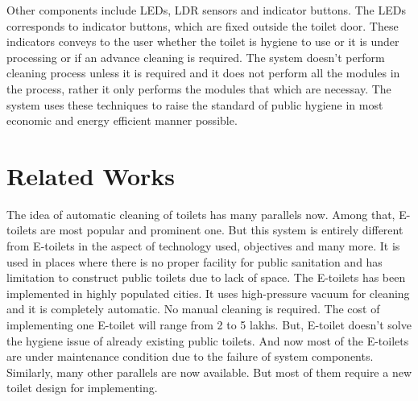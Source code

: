 \documentclass[conference]{IEEEtran}
\begin{document}
Other components include LEDs, LDR sensors and indicator buttons. The LEDs corresponds to indicator buttons, which are fixed outside the toilet door. These indicators conveys to the user whether the toilet is hygiene to use or it is under processing or if an advance cleaning is required. The system doesn't perform cleaning process unless it is required and it does not perform all the modules in the process, rather it only performs the modules that which are necessay. The system uses these techniques to raise the standard of public hygiene in most economic and energy efficient manner possible.

\section{Related Works}
    The idea of automatic cleaning of toilets has many parallels now. Among that, E-toilets are most popular and prominent one. But this system is entirely different from E-toilets in the aspect of technology used, objectives and many more. It is used in places where there is no proper facility for public sanitation and has limitation to construct public toilets due to lack of space. The E-toilets has been implemented in highly populated cities. It uses high-pressure vacuum for cleaning and it is completely automatic. No manual cleaning is required. The cost of implementing one E-toilet will range from 2 to 5 lakhs. But, E-toilet doesn't solve the hygiene issue of already existing public toilets. And now most of the E-toilets are under maintenance condition due to the failure of system components.
    Similarly, many other parallels are now available. But most of them require a new toilet design for implementing.
\end{document}
